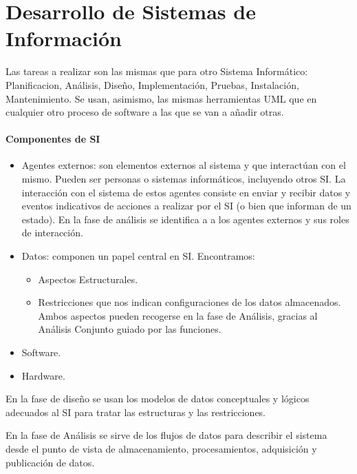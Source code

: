 \documentclass[12pt]{report} %
\providecommand{\tightlist}{%
  \setlength{\itemsep}{0pt}\setlength{\parskip}{0pt}}
\begin{document}
\hypertarget{desarrollo-de-sistemas-de-informaciuxf3n}{%
\chapter{Desarrollo de Sistemas de
Información}\label{desarrollo-de-sistemas-de-informaciuxf3n}}

Las tareas a realizar son las mismas que para otro Sistema Informático:
Planificacion, Análisis, Diseño, Implementación, Pruebas, Instalación,
Mantenimiento. Se usan, asimismo, las mismas herramientas UML que en
cualquier otro proceso de software a las que se van a añadir otras.

\subsubsection*{Componentes de SI}

\begin{itemize}
\tightlist
\item
  Agentes externos: son elementos externos al sistema y que interactúan
  con el mismo. Pueden ser personas o sistemas informáticos, incluyendo
  otros SI. La interacción con el sistema de estos agentes consiste en
  enviar y recibir datos y eventos indicativos de acciones a realizar
  por el SI (o bien que informan de un estado). En la fase de análisis
  se identifica a a los agentes externos y sus roles de interacción.
\item
  Datos: componen un papel central en SI. Encontramos:

  \begin{itemize}
  \tightlist
  \item
    Aspectos Estructurales.
  \item
    Restricciones que nos indican configuraciones de los datos
    almacenados. Ambos aspectos pueden recogerse en la fase de Análisis,
    gracias al Análisis Conjunto guiado por las funciones.
  \end{itemize}
\item
  Software.
\item
  Hardware.
\end{itemize}

En la fase de diseño se usan los modelos de datos conceptuales y lógicos
adecuados al SI para tratar las estructuras y las restricciones.

En la fase de Análisis se sirve de los flujos de datos para describir el
sistema desde el punto de vista de almacenamiento, procesamientos,
adquisición y publicación de datos.
\end{document}
